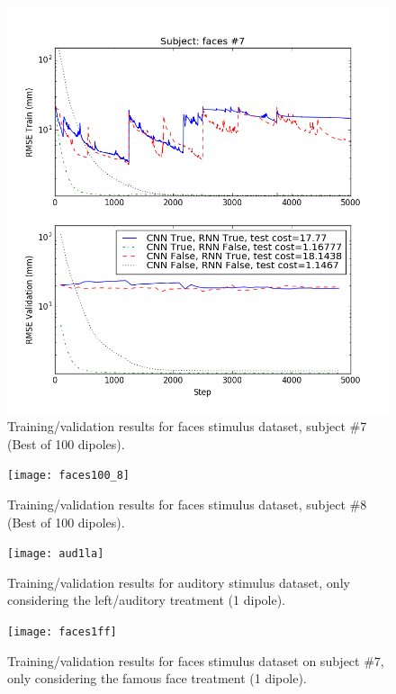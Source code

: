 \documentclass[journal,12pt,onecolumn,draftclsnofoot,]{IEEEtran}
\begin{document}
\begin{figure}[!h]
\centering
\includegraphics[width=6.75in]{faces100}
\caption{Training/validation results for faces stimulus dataset, subject \#7 (Best of 100 dipoles).}
\label{fig:faces100}
\end{figure}

\begin{figure}[!h]
\centering
\texttt{[image: faces100\_8]}
\caption{Training/validation results for faces stimulus dataset, subject \#8 (Best of 100 dipoles).}
\label{fig:faces100_8}
\end{figure}

\begin{figure}[!h]
\centering
\texttt{[image: aud1la]}
\caption{Training/validation results for auditory stimulus dataset, only considering the left/auditory treatment (1 dipole).}
\label{fig:aud1la}
\end{figure}


\begin{figure}[!h]
\centering
\texttt{[image: faces1ff]}
\caption{Training/validation results for faces stimulus dataset on subject \#7, only considering the famous face treatment (1 dipole).}
\label{fig:faces1ff}
\end{figure}
\end{document}
